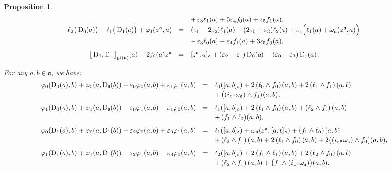 \documentclass[10pt,a4paper]{amsart}
\newtheorem{proposition}{Proposition}
\newcommand{\D}{\operatorname{D}}
\newcommand{\ai}{\mathfrak{a}}
\newcommand{\gl}{\mathfrak{gl}}
\newcommand{\w}{\omega}
\begin{document}
\begin{proposition}
\begin{equation*}
\begin{array}{r c l}
	&&+\,\varepsilon_3\ell_1(a)+3\varepsilon_4f_0(a)+\varepsilon_5f_1(a),\\\vspace{0.75mm}
	\ell_2\big(\D_0(a)\big)-\ell_1\big(\D_1(a)\big)+\varphi_1(z^\ai,a)&=&(\varepsilon_1-2\varepsilon_2)\ell_1(a)+(2\varepsilon_0+\varepsilon_3)\ell_2(a)+\varepsilon_1\Big(\ell_1(a)+\w_\ai(z^\ai,a)\Big)\\\vspace{2.5mm}
	&&-\,\varepsilon_3\ell_0(a)-\varepsilon_4f_1(a)+3\varepsilon_5f_0(a),\\
	\big[\D_0,\D_1\big]_{\gl(\ai)}(a)+2f_0(a)z^\ai&=&[z^\ai,a]_\ai+(\varepsilon_2-\varepsilon_1)\D_0(a)-(\varepsilon_0+\varepsilon_3)\D_1(a)\,;
	\end{array}
\end{equation*}
	\item[$10.$] For any $a,b\in\ai$, we have:
	\begin{equation*}
		\begin{array}{r c l}\vspace{0.75mm}
		\varphi_0(\D_0(a),b)+\varphi_0(a,\D_0(b))-\varepsilon_0\varphi_0(a,b)+\varepsilon_1\varphi_1(a,b)&=&\ell_0([a,b]_\ai)+2\left(\ell_0\wedge f_0\right)(a,b)+2\left(\ell_1\wedge f_1\right)(a,b)\\\vspace{2.5mm}
		&&+\,\big((i_{z^\ai}\w_\ai)\wedge f_1\big)(a,b),\\\vspace{0.75mm}
		\varphi_1(\D_0(a),b)+\varphi_1(a,\D_0(b))-\varepsilon_0\varphi_1(a,b)-\varepsilon_1\varphi_0(a,b)&=&\ell_1([a,b]_\ai)+2\left(\ell_1\wedge f_0\right)(a,b)+\left(\ell_2\wedge f_1\right)(a,b)\\\vspace{2.5mm}
		&&+\,(f_1\wedge \ell_0)(a,b),\\\vspace{0.75mm}
		\varphi_0(\D_1(a),b)+\varphi_0(a,\D_1(b))-\varepsilon_2\varphi_0(a,b)+\varepsilon_3\varphi_1(a,b)&=&\ell_1([a,b]_\ai)+\w_\ai(z^\ai,[a,b]_\ai)+\left(f_1\wedge \ell_0\right)(a,b)\\\vspace{2.5mm}
		&&+\left(\ell_2\wedge f_1\right)(a,b)+2\left(\ell_1\wedge f_0\right)(a,b)+2\big((i_{z^\ai}\w_\ai)\wedge f_0\big)(a,b),\\\vspace{0.75mm}
		\varphi_1(\D_1(a),b)+\varphi_1(a,\D_1(b))-\varepsilon_2\varphi_1(a,b)-\varepsilon_3\varphi_0(a,b)&=&\ell_2([a,b]_\ai)+2\left(f_1\wedge \ell_1\right)(a,b)+2\left(\ell_2\wedge f_0\right)(a,b)\\
		&&+\left(\ell_2\wedge f_1\right)(a,b)+\big(f_1\wedge(i_{z^\ai}\w_\ai)\big)(a,b).\end{array}
	\end{equation*}
\end{proposition}
\end{document}
